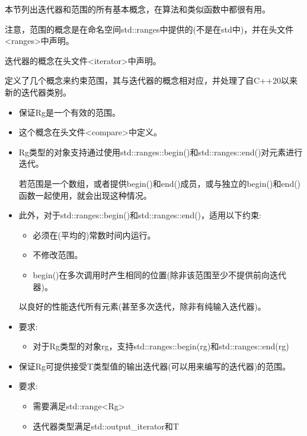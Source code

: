 
本节列出迭代器和范围的所有基本概念，在算法和类似函数中都很有用。

注意，范围的概念是在命名空间std::ranges中提供的(不是在std中)，并在头文件<ranges>中声明。

迭代器的概念在头文件<iterator>中声明。


定义了几个概念来约束范围，其与迭代器的概念相对应，并处理了自C++20以来新的迭代器类别。


\begin{itemize}
\item
保证Rg是一个有效的范围。

\item
这个概念在头文件<compare>中定义。

\item
Rg类型的对象支持通过使用std::ranges::begin()和std::ranges::end()对元素进行迭代。

若范围是一个数组，或者提供begin()和end()成员，或与独立的begin()和end()函数一起使用，就会出现这种情况。

\item
此外，对于std::ranges::begin()和std::ranges::end()，适用以下约束:

\begin{itemize}
\item
必须在(平均的)常数时间内运行。

\item
不修改范围。

\item
begin()在多次调用时产生相同的位置(除非该范围至少不提供前向迭代器)。
\end{itemize}

以良好的性能迭代所有元素(甚至多次迭代，除非有纯输入迭代器)。

\item
要求:

\begin{itemize}
\item
对于Rg类型的对象rg，支持std::ranges::begin(rg)和std::ranges::end(rg)
\end{itemize}
\end{itemize}


\begin{itemize}
\item
保证Rg可提供接受T类型值的输出迭代器(可以用来编写的迭代器)的范围。

\item
要求:

\begin{itemize}
\item
需要满足std::range<Rg>

\item
迭代器类型满足std::output\_iterator和T
\end{itemize}
\end{itemize}


